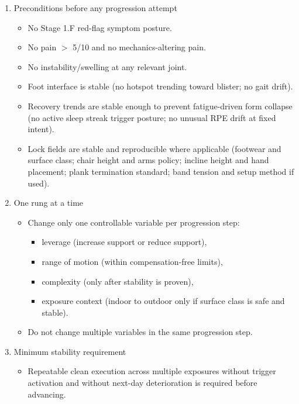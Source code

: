 \documentclass[10pt]{article}
\begin{document}
\begin{enumerate}
\item Preconditions before any progression attempt

\begin{itemize}
\item No Stage 1.F red-flag symptom posture.
\item No pain $>$ 5/10 and no mechanics-altering pain.
\item No instability/swelling at any relevant joint.
\item Foot interface is stable (no hotspot trending toward blister; no gait drift).
\item Recovery trends are stable enough to prevent fatigue-driven form collapse (no active sleep streak trigger posture; no unusual RPE drift at fixed intent).
\item Lock fields are stable and reproducible where applicable (footwear and surface class; chair height and arms policy; incline height and hand placement; plank termination standard; band tension and setup method if used).
\end{itemize}

\item One rung at a time

\begin{itemize}
\item Change only one controllable variable per progression step:
  \begin{itemize}
  \item leverage (increase support or reduce support),
  \item range of motion (within compensation-free limits),
  \item complexity (only after stability is proven),
  \item exposure context (indoor to outdoor only if surface class is safe and stable).
  \end{itemize}
\item Do not change multiple variables in the same progression step.
\end{itemize}

\item Minimum stability requirement

\begin{itemize}
\item Repeatable clean execution across multiple exposures without trigger activation and without next-day deterioration is required before advancing.
\end{itemize}


\end{enumerate}
\end{document}

